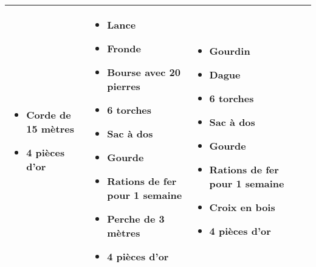 \begin{tabularx}{\textwidth}{|X|X|X|X|X|}
\begin{itemize}
    \item Corde de 15 mètres
    \item 4 pièces d'or
  \end{itemize}
  &
  \begin{itemize}
    \item Lance
    \item Fronde
    \item Bourse avec 20 pierres
    \item 6 torches
    \item Sac à dos
    \item Gourde
    \item Rations de fer pour 1 semaine
    \item Perche de 3 mètres
    \item 4 pièces d'or
  \end{itemize}
  &
  \begin{itemize}
    \item Gourdin
    \item Dague
    \item 6 torches
    \item Sac à dos
    \item Gourde
    \item Rations de fer pour 1 semaine
    \item Croix en bois
    \item 4 pièces d'or
  \end{itemize}
  \\\hline


\end{tabularx}
